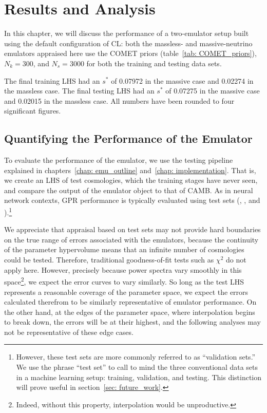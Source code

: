 \chapter{Results and Analysis}
\label{chap: default_emu}

In this chapter, we will discuss the performance of a two-emulator setup
built using the default configuration of CL: both the massless- and
massive-neutrino emulators appraised here use the COMET priors
(table~\ref{tab: COMET_priors}), $N_k = 300$, and $N_s = 3000$ for both the
training and testing data sets.

The final training LHS had an $s^*$ of 0.07972 in the massive case and 
0.02274 in the massless case. The final testing LHS had an $s^*$ of 0.07275 in 
the massive case and 0.02015 in the massless case. All numbers have been 
rounded to four significant figures.

\section{Quantifying the Performance of the Emulator}

To evaluate the performance of the emulator, we use the testing pipeline
explained in chapters~\ref{chap: emu_outline} and~\ref{chap: implementation}.
That is, we create an LHS of test cosmologies, which the training stages have
never seen, and compare the output of the emulator object to that of
CAMB. As in neural network contexts, GPR performance is typically evaluated
using test sets (\citealp{Mancini}, \citealp{Arico}, and
\citealp{Eggemeier}).\footnote{However, these test sets are
more commonly referred to as ``validation sets.'' We use the phrase
``test set'' to call to mind the three conventional data sets in a machine
learning setup: training, validation, and testing. This distinction will
prove useful in section~\ref{sec: future_work}.}

We appreciate that appraisal based on test sets
may not provide hard boundaries on the true
range of errors associated with the emulators,
because the continuity of the parameter hypervolume means that an infinite
number of cosmologies could be tested. Therefore, traditional
goodness-of-fit tests such as $\chi^2$ do not apply here.
However, precisely because
power spectra vary smoothly in this space\footnote{Indeed, without this
property, interpolation would be unproductive.}, we expect the error 
curves to vary similarly. So long as the test LHS represents a reasonable
coverage of the parameter space, we expect the errors calculated therefrom to
be similarly representative of emulator performance. On the other
hand, at the edges of the parameter space, where interpolation begins to
break down, the errors will be at their highest, and the following analyses
may not be representative of these edge cases.

